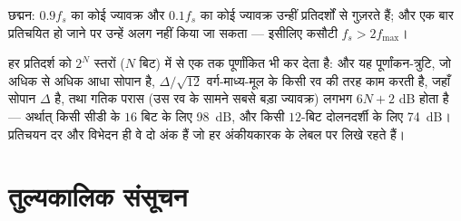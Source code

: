 \begin{omfigure}

{\small छद्मन: $0.9f_s$ का कोई ज्यावक्र और $0.1f_s$ का कोई ज्यावक्र
उन्हीं प्रतिदर्शों से गुज़रते हैं; और एक बार प्रतिचयित हो जाने पर उन्हें अलग नहीं
किया जा सकता --- इसीलिए कसौटी $f_s > 2f_{\max}$।}
\end{omfigure}

\begin{remark}[क्वांटीकरण]\label{rem:b2:feedback-oscillators:quantization}
 हर प्रतिदर्श को
$2^N$ स्तरों ($N$ बिट) में से एक तक पूर्णांकित भी कर देता है: और यह पूर्णांकन-त्रुटि, जो अधिक से अधिक आधा सोपान है,
$\Delta/\sqrt{12}$ वर्ग-माध्य-मूल के किसी रव की तरह काम करती है, जहाँ सोपान $\Delta$ है, तथा
गतिक परास (उस रव के सामने सबसे बड़ा ज्यावक्र) लगभग $6N + 2$ dB होता है ---
अर्थात् किसी सीडी के $16$ बिट के लिए \qty{98}{dB}, और किसी $12$-बिट
दोलनदर्शी के लिए \qty{74}{dB}। प्रतिचयन दर और विभेदन ही वे दो अंक हैं जो हर
अंकीयकारक के लेबल पर लिखे रहते हैं।
\end{remark}

\section{तुल्यकालिक संसूचन}

